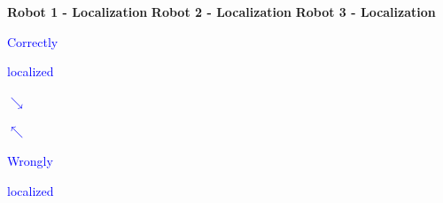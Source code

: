 \begin{frame}
	\vspace{-6.15cm}
	
	\begin{tabbing}
		\hspace{0.21cm}
		\tiny
		\textbf{Robot 1 - Localization}
		\hspace{1.79cm}
		\textbf{Robot 2 - Localization}
		\hspace{1.79cm}
		\textbf{Robot 3 - Localization}
	\end{tabbing}
	
	\vspace{-1cm}
	
	\begin{tabbing}
		\hspace{0.4cm}
		\tiny
		\textcolor{blue}{Correctly}
	\end{tabbing}
	
	\vspace{-1.2cm}
	
	\begin{tabbing}
		\hspace{0.42cm}
		\tiny
		\textcolor{blue}{localized}
	\end{tabbing}
	
	\vspace{-1.17cm}
	
	\begin{tabbing}
		\footnotesize
		\hspace{0.87cm}
		\textcolor{blue}{$ \searrow $}
	\end{tabbing}
	
	\vspace{-1.43cm}
	
	\begin{tabbing}
		\footnotesize
		\hspace{2.68cm}
		\textcolor{blue}{$ \nwarrow $}
	\end{tabbing}
	
	\vspace{-1.2cm}
	
	\begin{tabbing}
		\hspace{2.53cm}
		\tiny
		\textcolor{blue}{Wrongly}
	\end{tabbing}
	
	\vspace{-1.2cm}
	
	\begin{tabbing}
		\hspace{2.52cm}
		\tiny
		\textcolor{blue}{localized}
	\end{tabbing}
	

\end{frame}
